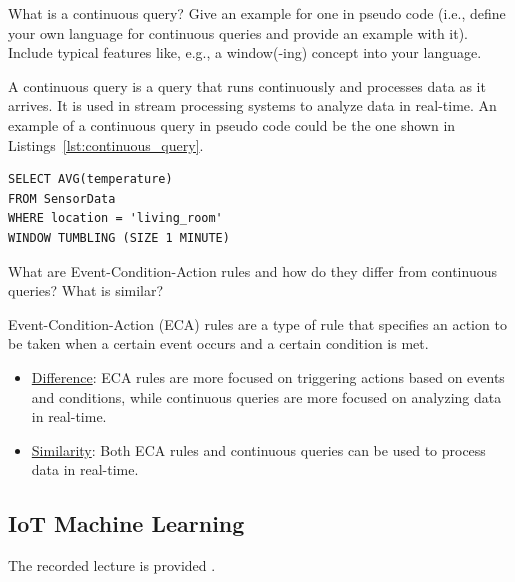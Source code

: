 \begin{ejercicio}
    What is a continuous query? Give an example for one in pseudo code (i.e., define your own language for continuous queries and provide an example with it). Include typical features like, e.g., a window(-ing) concept into your language.

    A continuous query is a query that runs continuously and processes data as it arrives. It is used in stream processing systems to analyze data in real-time. An example of a continuous query in pseudo code could be the one shown in Listings~\ref{lst:continuous_query}.
\begin{listing}
\begin{verbatim}
SELECT AVG(temperature)
FROM SensorData
WHERE location = 'living_room'
WINDOW TUMBLING (SIZE 1 MINUTE)
\end{verbatim}
\caption{Example of a continuous query that calculates the average temperature in the living room every minute.}
\label{lst:continuous_query}
\end{listing}
\end{ejercicio}

\begin{ejercicio}
    What are Event-Condition-Action rules and how do they differ from continuous queries? What is similar?

    Event-Condition-Action (ECA) rules are a type of rule that specifies an action to be taken when a certain event occurs and a certain condition is met.
    \begin{itemize}
        \item \ul{Difference}: ECA rules are more focused on triggering actions based on events and conditions, while continuous queries are more focused on analyzing data in real-time.
        \item \ul{Similarity}: Both ECA rules and continuous queries can be used to process data in real-time.
    \end{itemize}
\end{ejercicio}

\newpage\subsection{IoT Machine Learning}

The recorded lecture is provided .

